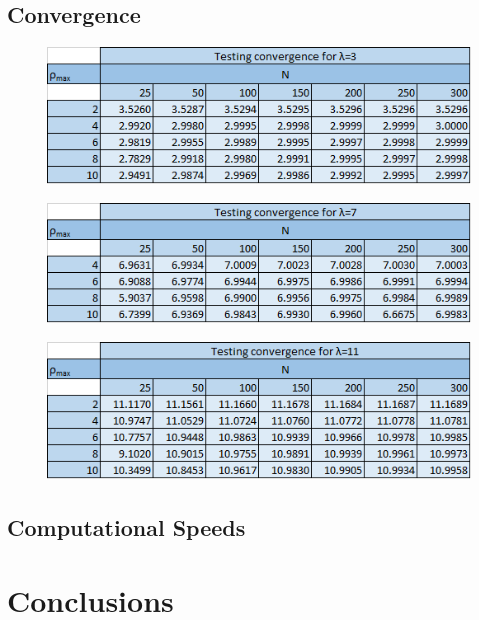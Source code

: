 \documentclass[%
oneside,                 %
final,                   %
10pt]{article}
\begin{document}
\subsection{Convergence}

\begin{figure}[H]\label{fig:3}
  \centering
    \includegraphics[width=1.1\textwidth]{3.png}
\end{figure}

\begin{figure}[H]\label{fig:7}
  \centering
    \includegraphics[width=1.1\textwidth]{7.png}
\end{figure}

\begin{figure}[H]\label{fig:11}
  \centering
    \includegraphics[width=1.1\textwidth]{11.png}
\end{figure}
\subsection{Computational Speeds}


\section{Conclusions}
\end{document}
